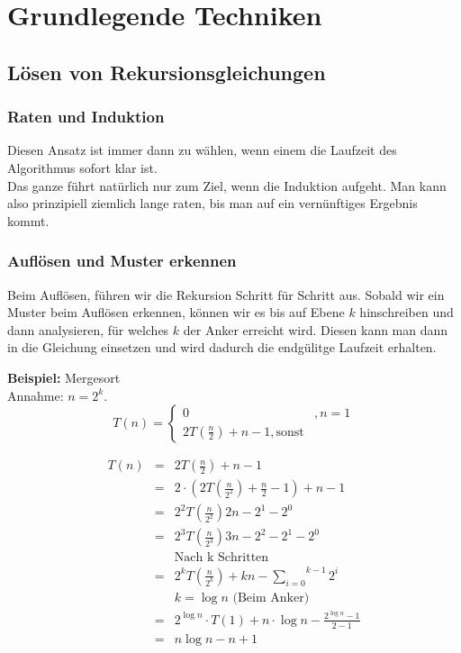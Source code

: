 \chapter{Grundlegende Techniken}

\section{Lösen von Rekursionsgleichungen}

\subsection{Raten und Induktion}

Diesen Ansatz ist immer dann zu wählen, wenn einem die Laufzeit des Algorithmus sofort klar ist.\\

Das ganze führt natürlich nur zum Ziel, wenn die Induktion aufgeht. Man kann also prinzipiell ziemlich lange raten, bis man auf ein vernünftiges Ergebnis kommt.

\subsection{Auflösen und Muster erkennen}

Beim Auflösen, führen wir die Rekursion Schritt für Schritt aus. Sobald wir ein Muster beim Auflösen erkennen, können wir es bis auf Ebene $k$ hinschreiben und dann analysieren, für welches $k$ der Anker erreicht wird. Diesen kann man dann in die Gleichung einsetzen und wird dadurch die endgülitge Laufzeit erhalten.

\textbf{Beispiel:} Mergesort\\
Annahme: $n = 2^k$.
$$
T(n) = \left\{
\begin{array}{lr}
0 & , n = 1\\
2 T\left( \frac{n}{2} \right) + n - 1, \text{sonst}
\end{array}
\right.
$$

$$
\begin{array}{rcl}
T(n) &=& 2 T\left( \frac{n}{2} \right) + n - 1\\
&=& 2 \cdot \left( 2 T\left( \frac{n}{2^2} \right) + \frac{n}{2} - 1\right) + n - 1\\
&=& 2^2 T\left( \frac{n}{2^2} \right) 2n -2^1 - 2^0\\
&=& 2^3 T \left( \frac{n}{2^3} \right) 3n - 2^2 - 2^ 1 - 2^0\\
&& \text{Nach k Schritten}\\
&=& 2^k T \left( \frac{n}{2^k} \right) +  kn - \overset{k-1}{\underset{i=0}{\sum}} 2^i\\
&& k = \log n \text{ (Beim Anker)}\\
&=& 2^{\log n} \cdot T(1) + n \cdot \log n - \frac{2^{\log n} - 1}{2 - 1}\\
&=& n \log n - n + 1
\end{array}
$$

